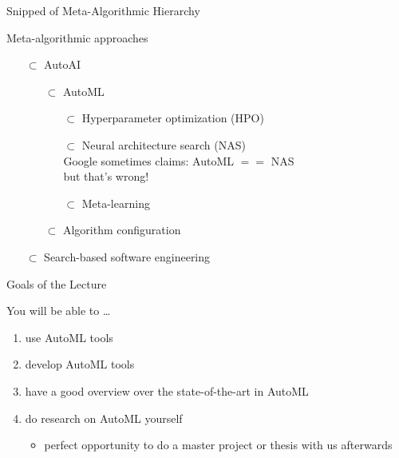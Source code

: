 \begin{frame}[c]{Snipped of Meta-Algorithmic Hierarchy}


Meta-algorithmic approaches

\begin{itemize}
  \item[$\subset$] AutoAI
  \pause
  \begin{itemize}
		\item[$\subset$] AutoML
		\pause
		\begin{itemize}
		 	\item[$\subset$] Hyperparameter optimization (HPO)
		 	\pause
		 	\item[$\subset$] Neural architecture search (NAS)\\
		 	   \hspace{1em} Google sometimes claims: AutoML $==$ NAS\\
		 	   \hspace{1em} but that's wrong!
		 	\pause
		 	\item[$\subset$] Meta-learning\\
		\end{itemize}
		\pause
		\item[$\subset$] Algorithm configuration
	\end{itemize}
	\pause
	\item[$\subset$] Search-based software engineering
\end{itemize}

\end{frame}
\begin{frame}[c]{Goals of the Lecture}

You will be able to \ldots
\begin{enumerate}
  \item use AutoML tools
  \smallskip
  \item develop AutoML tools
  \smallskip
  \item have a good overview over the state-of-the-art in AutoML
  \smallskip
  \item do research on AutoML yourself
  \begin{itemize}
    \item perfect opportunity to do a master project or thesis with us afterwards
  \end{itemize}
\end{enumerate}

\end{frame}
